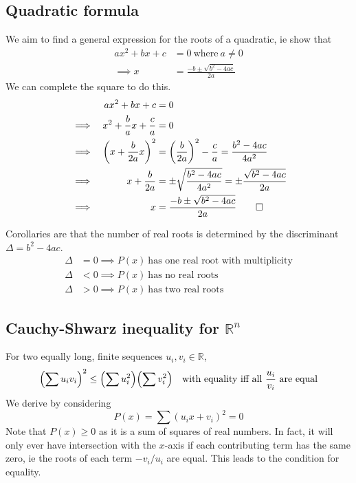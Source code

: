 \documentclass[fleqn,a4paper,11pt]{article}
\begin{document}
    \subsection{Quadratic formula} \label{sec_quad_formula}

    We aim to find a general expression for the roots of a quadratic, ie show
    that
    \begin{equation}
    \begin{split}
    ax^2 + bx + c &= 0\ \text{where}\ a \neq 0 \\
    \implies x &= \frac{-b \pm \sqrt{b^2 - 4ac}}{2a}
    \end{split}
    \end{equation}
    We can complete the square to do this.
    \begin{alignat*}{2}
    &&ax^2 + bx + c &= 0 \\
    &\implies& x^2 + \frac{b}{a}x + \frac{c}{a} &= 0 \\
    &\implies& \pqty{x + \frac{b}{2a}x}^2 &= \pqty{\frac{b}{2a}}^2 - \frac{c}{a}
        = \frac{b^2 - 4ac}{4a^2} \\
    &\implies& x + \frac{b}{2a} &= \pm \sqrt{\frac{b^2 - 4ac}{4a^2}}
        = \pm \frac{\sqrt{b^2 - 4ac}}{2a} \\
    &\implies& x &= \frac{-b \pm \sqrt{b^2 - 4ac}}{2a} \qed
    \end{alignat*}

    Corollaries are that the number of real roots is determined by the
    discriminant \({\Delta = b^2 - 4ac}\).
    \begin{align}
    \Delta &= 0 \implies P(x)\ \text{has one real root with multiplicity} \\
    \Delta &< 0 \implies P(x)\ \text{has no real roots} \\
    \Delta &> 0 \implies P(x)\ \text{has two real roots}
    \end{align}

    \subsection[Cauchy-Shwarz inequality for \(\mathbb{R}^n\)]
               {Cauchy-Shwarz inequality for \boldmath\(\mathbb{R}^n\)}

    For two equally long, finite sequences \(u_i, v_i \in \mathbb{R}\),
    \begin{equation}
    \pqty{\sum u_i v_i}^2 \le \pqty{\sum u_i^2} \pqty{\sum v_i^2}
        \quad \text{with equality iff all \(\frac{u_i}{v_i}\) are equal}
    \end{equation}
    We derive by considering
    \begin{equation*}
    P(x) = \sum (u_i x + v_i)^2 = 0
    \end{equation*}
    Note that \(P(x) \ge 0\) as it is a sum of squares of real numbers. In fact,
    it will only ever have intersection with the \(x\)-axis if each contributing
    term has the same zero, ie the roots of each term \(-v_i/u_i\) are equal.
    This leads to the condition for equality.
\end{document}
